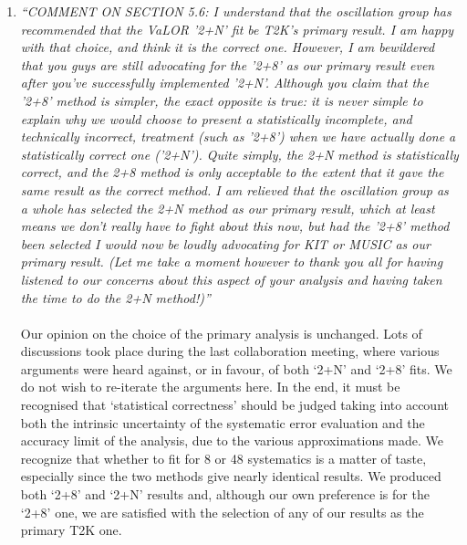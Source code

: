 \begin{enumerate}
\vspace{5 mm}
\item
{\em
  ``COMMENT ON SECTION 5.6: I understand that the oscillation group has recommended that the VaLOR '2+N' 
  fit be T2K's primary result.  I am happy with that choice, and think it is the correct one.  However, 
  I am bewildered that you guys are still advocating for the '2+8' as our primary result even after you've 
  successfully implemented '2+N'.  Although you claim that the '2+8' method is simpler, the exact opposite is true: 
  it is never simple to explain why we would choose to present a statistically incomplete, and technically incorrect, 
  treatment (such as '2+8') when we have actually done a statistically correct one ('2+N'). Quite simply, the 2+N 
  method is statistically correct, and the 2+8 method is only acceptable to the extent that it gave the same result 
  as the correct method.  I am relieved that the oscillation group as a whole has selected the 2+N method as our primary result, 
  which at least means we don't really have to fight about this now, but had the '2+8' method been selected I would now be 
  loudly advocating for KIT or MUSIC as our primary result.  
  (Let me take a moment however to thank you all for having listened to our concerns about 
  this aspect of your analysis and having taken the time to do the 2+N method!)''
}\\
\\
Our opinion on the choice of the primary analysis is unchanged.
Lots of discussions took place during the last collaboration meeting, where various arguments were heard against, 
or in favour, of both `2+N' and `2+8' fits. We do not wish to re-iterate the arguments here.
In the end, it must be recognised that `statistical correctness' should be judged taking into account 
both the intrinsic uncertainty of the systematic error evaluation and
the accuracy limit of the analysis, due to the various approximations made.
We recognize that whether to fit for 8 or 48 systematics is a matter of taste, especially since the two
methods give nearly identical results. 
We produced both `2+8' and `2+N' results and, although our own preference is for the `2+8' one, 
we are satisfied with the selection of any of our results as the primary T2K one.


\end{enumerate}
